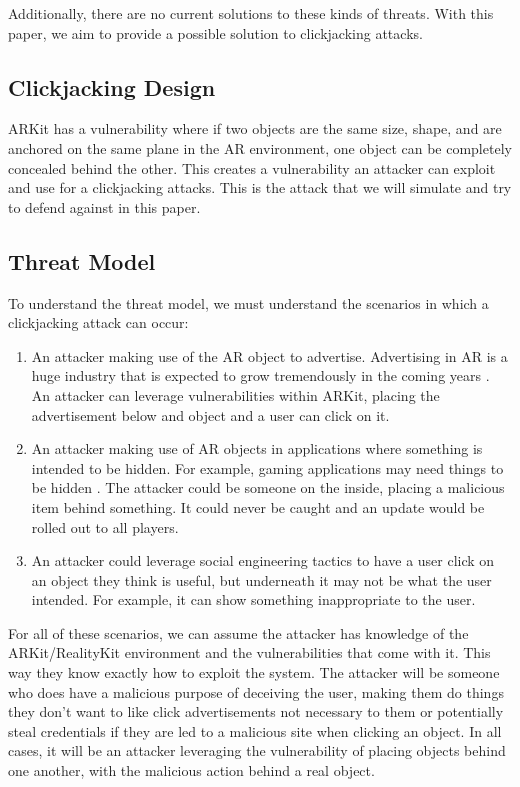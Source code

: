 \documentclass[conference]{IEEEtran}
\begin{document}
Additionally, there are no current solutions to these kinds of threats. With this paper, we aim to provide a possible solution to clickjacking attacks. 

\subsection{Clickjacking Design}

ARKit has a vulnerability where if two objects are the same size, shape, and are anchored on the same plane in the AR environment, one object can be completely concealed behind the other. This creates a vulnerability an attacker can exploit and use for a clickjacking attacks. This is the attack that we will simulate and try to defend against in this paper.  

\subsection{Threat Model}

To understand the threat model, we must understand the scenarios in which a clickjacking attack can occur: 

\begin{enumerate}
    \item An attacker making use of the AR object to advertise. Advertising in AR is a huge industry that is expected to grow tremendously in the coming years \cite{noauthor_ar_nodate}. An attacker can leverage vulnerabilities within ARKit, placing the advertisement below and object and a user can click on it.
    \item An attacker making use of AR objects in applications where something is intended to be hidden. For example, gaming applications may need things to be hidden \cite{cheng_when_nodate}. The attacker could be someone on the inside, placing a malicious item behind something. It could never be caught and an update would be rolled out to all players. 
    \item An attacker could leverage social engineering tactics to have a user click on an object they think is useful, but underneath it may not be what the user intended. For example, it can show something inappropriate to the user. 
\end{enumerate}

For all of these scenarios, we can assume the attacker has knowledge of the ARKit/RealityKit environment and the vulnerabilities that come with it. This way they know exactly how to exploit the system. The attacker will be someone who does have a malicious purpose of deceiving the user, making them do things they don't want to like click advertisements not necessary to them or potentially steal credentials if they are led to a malicious site when clicking an object. In all cases, it will be an attacker leveraging the vulnerability of placing objects behind one another, with the malicious action behind a real object. 
\end{document}
